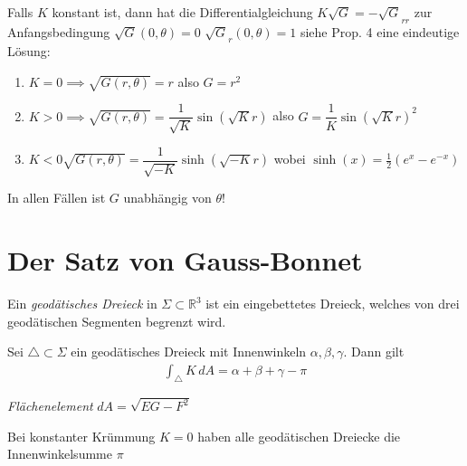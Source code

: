 \documentclass[../main.tex]{subfiles}
\begin{document}
\begin{geometric}


\end{geometric}
\begin{application}
Falls $K$ konstant ist, dann hat die Differentialgleichung 
$ K \sqrt{G}= - \sqrt{G}_{rr}$ zur Anfangsbedingung $\sqrt{G}(0,\theta)=0$
$\sqrt{G}_r(0,\theta)=1$ siehe Prop. 4 eine eindeutige Lösung:
\leavevmode
\begin{enumerate}
    \item $K=0 \implies \sqrt{G(r,\theta)}=r$ also $G=r^2$
    \item $K > 0 \implies \sqrt{G(r,\theta)}= \dfrac{1}{\sqrt{K}}\sin (\sqrt{K}r)$ also $G=\dfrac{1}{K}\sin (\sqrt{K}r)^2$
    \item $K < 0 \sqrt{G(r, \theta)}=\dfrac{1}{\sqrt{-K}} \sinh (\sqrt{-K}r)$ wobei $\sinh (x)=\frac{1}{2}(e^x - e^{-x})$
\end{enumerate}  
In allen Fällen ist $G$ unabhängig von $\theta$!
\end{application}

\section{Der Satz von Gauss-Bonnet}

\begin{definition}
    Ein \emph{geodätisches Dreieck} in $\Sigma \subset \mathbb{R}^3$ ist ein eingebettetes Dreieck, welches von drei geodätischen Segmenten begrenzt wird.
\end{definition}


\begin{theorem}
    Sei $\triangle \subset \Sigma$ ein geodätisches Dreieck mit Innenwinkeln $\alpha, \beta, \gamma$. Dann gilt
    \begin{align*}
        \int_{\triangle} K \,dA = \alpha + \beta + \gamma - \pi 
    \end{align*}
\end{theorem}
 
\begin{recall}
    \emph{Flächenelement} $dA = \sqrt{EG-F^{2}}$ 
\end{recall}

\begin{remark}
    Bei konstanter Krümmung $K = 0$ haben alle geodätischen Dreiecke die Innenwinkelsumme $\pi$
\end{remark}
\end{document}
